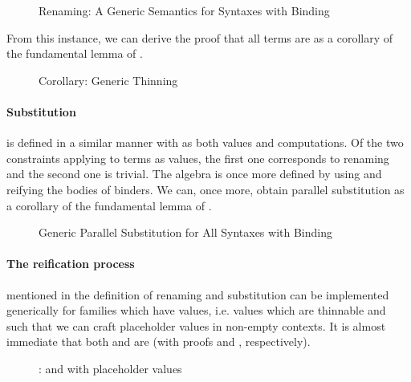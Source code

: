 \begin{figure}[h]
\caption{Renaming: A Generic Semantics for Syntaxes with Binding\label{fig:genrensem}}
\end{figure}

From this instance, we can derive the proof that all terms are  as
a corollary of the fundamental lemma of .

\begin{figure}[h]
\caption{Corollary: Generic Thinning\label{fig:genren}}
\end{figure}

\paragraph{Substitution} is defined in a similar manner with 
as both values and computations. Of the two constraints applying to
terms as values, the first one corresponds to renaming and the second
one is trivial. The algebra is once more defined by using  and
reifying the bodies of binders. We can, once more, obtain parallel
substitution as a corollary of the fundamental lemma of .

\begin{figure}[h]
\caption{Generic Parallel Substitution for All Syntaxes with Binding\label{fig:gensub}}
\end{figure}

\paragraph{The reification process} mentioned in the definition of renaming
and substitution can be implemented generically for \semrec{} families
which have  values, i.e.  values which are thinnable and
such that we can craft placeholder values in non-empty contexts. It is
almost immediate that both  and  are  (with
proofs  and ,
respectively).

\begin{figure}[h]
\caption{:  and with placeholder values}
\end{figure}

